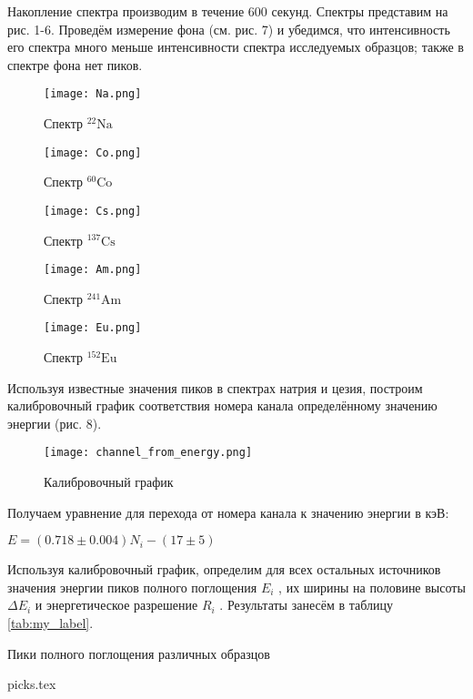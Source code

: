 Накопление спектра производим в течение 600 секунд. Спектры представим на рис.
1-6. Проведём измерение фона (см. рис. 7) и убедимся, что интенсивность его
спектра много меньше интенсивности спектра исследуемых образцов; также в спектре
фона нет пиков.

\begin{figure}
\begin{center}
  \texttt{[image: Na.png]}
  \caption{Спектр ${}^{22}{\text{Na}}$}
  \texttt{[image: Co.png]}
  \caption{Спектр ${}^{60}{\text{Co}}$}
\end{center}
\end{figure}

\begin{figure}
\begin{center}
  \texttt{[image: Cs.png]}
  \caption{Спектр ${}^{137}{\text{Cs}}$}
  \texttt{[image: Am.png]}
  \caption{Спектр ${}^{241}{\text{Am}}$}
\end{center}
\end{figure}

\begin{figure}
\begin{center}
  \texttt{[image: Eu.png]}
  \caption{Спектр ${}^{152}{\text{Eu}}$}
\end{center}
\end{figure}

Используя известные значения пиков в спектрах натрия и цезия, построим
калибровочный график соответствия номера канала определённому значению энергии
(рис. 8).

\begin{figure}[h!]
  \centering
  \texttt{[image: channel\_from\_energy.png]}
  \caption{Калибровочный график}
\end{figure}

Получаем уравнение для перехода от номера канала к значению энергии в кэВ:
\begin{center}
    $E = (0.718 \pm 0.004)N_i - (17 \pm 5)$
\end{center}

Используя калибровочный график, определим для всех остальных источников значения
энергии пиков полного поглощения $E_i$ , их ширины на половине высоты $\Delta
E_i$ и энергетическое разрешение $R_i$ . Результаты занесём в таблицу \ref{tab:my_label}.

\begin{table}[h]
\begin{center}
  \caption{Пики полного поглощения различных образцов}
  \label{tab:my_label}
  {picks.tex}
\end{center}
\end{table}


